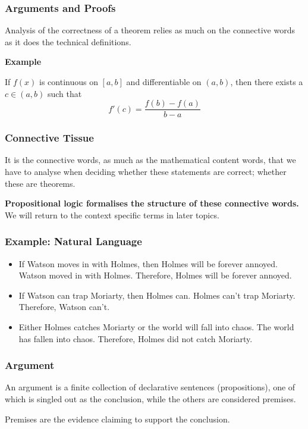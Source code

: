 \documentclass{beamer}
\begin{document}
  \begin{frame}
	\frametitle{Arguments and Proofs}
  
	Analysis of the correctness of a theorem relies as much on the connective words as it does the technical definitions. 
   
	{\bf Example}
	
	If $f(x)$ is continuous on $[a,b]$ and differentiable on $(a,b)$, then there exists a $c \in (a,b)$ such that $$f'(c) = \frac{f(b)-f(a)}{b-a}$$
  
  \end{frame}

\begin{frame}
	\frametitle{Connective Tissue}

	It is the connective words, as much as the mathematical content words, that we have to analyse when deciding whether these statements are correct; whether these are theorems.

	\vspace{5mm}

	{\bf Propositional logic formalises the structure of these connective words.} We will return to the context specific terms in later topics. 

\end{frame}

\begin{frame}
	\frametitle{Example: Natural Language}
	
	\begin{itemize}
		\item If Watson moves in with Holmes, then Holmes will be forever annoyed. Watson moved in with Holmes. Therefore, Holmes will be forever annoyed.
		\vspace{1cm}
		\item If Watson can trap Moriarty, then Holmes can. Holmes can't trap Moriarty. Therefore, Watson can't.
		\vspace{1cm}
		\item Either Holmes catches Moriarty or the world will fall into chaos. The world has fallen into chaos. Therefore, Holmes did not catch Moriarty.
		
	\end{itemize}	
\end{frame}


\begin{frame}
	\frametitle{Argument}
	

	\begin{center}
		An argument is a finite collection of declarative sentences (propositions), one of which is singled out as the conclusion, while the others are considered premises. 
	\end{center}
		 
	\vspace{0.5cm}
	
	Premises are the evidence claiming to support the conclusion.	

\end{frame}
\end{document}
